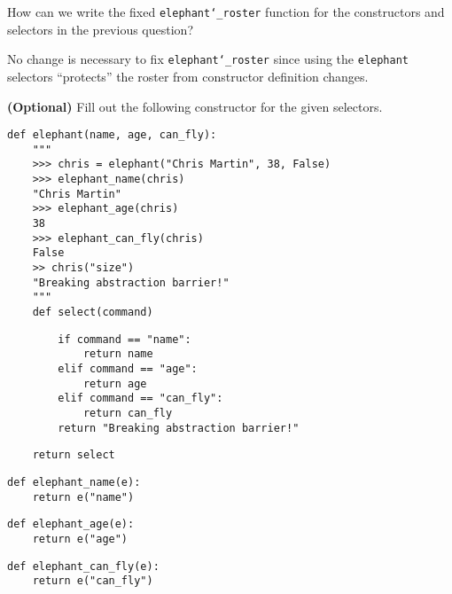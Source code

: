 \begin{blocksection}
\question How can we write the fixed \texttt{elephant\char`_roster} function for
the constructors and selectors in the previous question?

\begin{solution}[1.5in]
No change is necessary to fix \texttt{elephant\char`_roster} since using the
\texttt{elephant} selectors ``protects'' the roster from constructor definition
changes.
\end{solution}

\end{blocksection}

\begin{blocksection}
\question \textbf{(Optional)} Fill out the following constructor for the given
selectors.

\begin{lstlisting}
def elephant(name, age, can_fly):
    """
    >>> chris = elephant("Chris Martin", 38, False)
    >>> elephant_name(chris)
    "Chris Martin"
    >>> elephant_age(chris)
    38
    >>> elephant_can_fly(chris)
    False
    >> chris("size")
    "Breaking abstraction barrier!"
    """
    def select(command)
\end{lstlisting}
\begin{solution}[2in]
\begin{lstlisting}
        if command == "name":
            return name
        elif command == "age":
            return age
        elif command == "can_fly":
            return can_fly
        return "Breaking abstraction barrier!"
\end{lstlisting}
\end{solution}

\begin{lstlisting}
    return select
\end{lstlisting}

\begin{lstlisting}
def elephant_name(e):
    return e("name")
\end{lstlisting}

\begin{lstlisting}
def elephant_age(e):
    return e("age")
\end{lstlisting}

\begin{lstlisting}
def elephant_can_fly(e):
    return e("can_fly")
\end{lstlisting}

\end{blocksection}